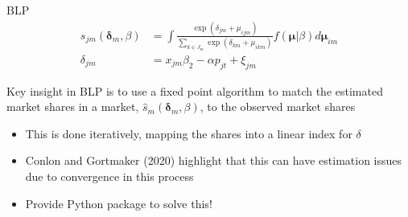 \documentclass[notes,11pt, aspectratio=169]{beamer}
\newenvironment{wideitemize}{\itemize\addtolength{\itemsep}{10pt}}{\enditemize}
\begin{document}
\begin{frame}{BLP}
    \begin{align*}
      s_{jm}(\boldsymbol{\delta}_{m}, \beta) &= \int \frac{\exp(\delta_{jm} + \mu_{ijm})}{\sum_{k \in J_{m}} \exp(\delta_{km} + \mu_{ikm})} f(\boldsymbol{\mu}|\beta) d \boldsymbol{\mu}_{im}\\
      \delta_{jm} &= x_{jm}\beta_{2} - \alpha p_{jt} + \xi_{jm}
    \end{align*}
  \begin{wideitemize}
  \item Key insight in BLP is to use a fixed point algorithm to match the estimated market shares in a market, $\hat{s}_{m}(\boldsymbol{\delta}_{m}, \beta)$, to the observed market shares
    \begin{itemize}
    \item This is done iteratively, mapping the shares into a linear index for $\delta$
    \item Conlon and Gortmaker (2020) highlight that this can have
      estimation issues due to convergence in this process
    \item Provide Python package to solve this!
    \end{itemize}
  \end{wideitemize}
\end{frame}
\end{document}
